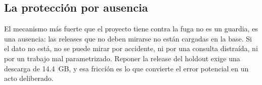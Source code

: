 \subsection{La protección por ausencia}

El mecanismo más fuerte que el proyecto tiene contra la fuga no es un guardia, es
una ausencia: las releases que no deben mirarse no están cargadas en la base. Si
el dato no está, no se puede mirar por accidente, ni por una consulta distraída,
ni por un trabajo mal parametrizado. Reponer la release del holdout exige una
descarga de 14.4~GB, y esa fricción es lo que convierte el error potencial en un
acto deliberado.
